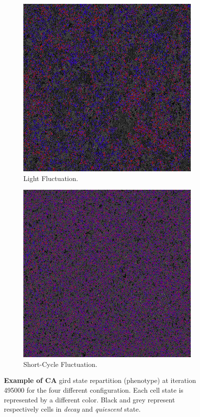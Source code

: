 \begin{figure}[H]
\begin{subfigure}{.25\textwidth}
  \centering
  \includegraphics[width=.9\linewidth]{img/light495000}
  \caption{Light Fluctuation.}
\end{subfigure}%
\begin{subfigure}{.25\textwidth}
  \centering
  \includegraphics[width=.9\linewidth]{img/small495000}
  \caption{Short-Cycle Fluctuation.}
\end{subfigure}
\caption{\textbf{Example of CA} gird state repartition (phenotype) at iteration 495000 for the four different configuration. Each cell state is represented by a different color. Black and grey represent respectively cells in \emph{decay} and \emph{quiescent} state.}
\label{fig:phenoexpl}
\end{figure}


